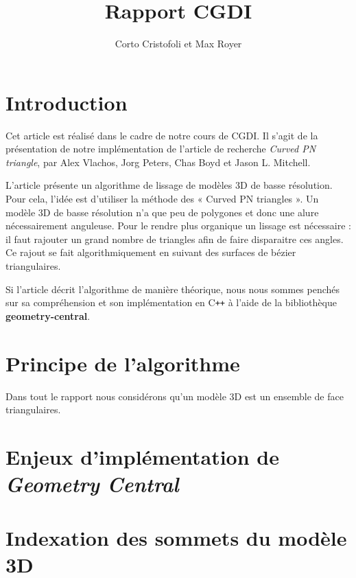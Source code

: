 \documentclass{article}
\title{Rapport CGDI}
\author{Corto Cristofoli et Max Royer}
\def\Cpp{C\texttt{++} }
\begin{document}
\maketitle



\section{Introduction}
Cet article est réalisé dans le cadre de notre cours de CGDI.
Il s'agit de la présentation de notre implémentation de l'article
de recherche \textit{Curved PN triangle}, par Alex Vlachos, Jorg Peters,
Chas Boyd et Jason L. Mitchell.

L'article présente un algorithme de lissage de modèles 3D de basse résolution.
Pour cela, l'idée est d'utiliser la méthode des « Curved PN triangles ». Un
modèle 3D de basse résolution n'a que peu de polygones et donc une alure
nécessairement anguleuse. Pour le rendre plus organique un lissage est
nécessaire : il faut rajouter un grand nombre de triangles afin de faire
disparaitre ces angles. Ce rajout se fait algorithmiquement en suivant des
surfaces de bézier triangulaires.

Si l'article décrit l'algorithme de manière théorique, nous nous sommes penchés
sur sa compréhension et son implémentation en \Cpp à l'aide de la
bibliothèque \textbf{geometry-central}.


\section{Principe de l'algorithme}
Dans tout le rapport nous considérons qu'un modèle 3D est un ensemble de face
triangulaires.

\section{Enjeux d'implémentation de \textit{Geometry Central}}

\section{Indexation des sommets du modèle 3D}
\end{document}
